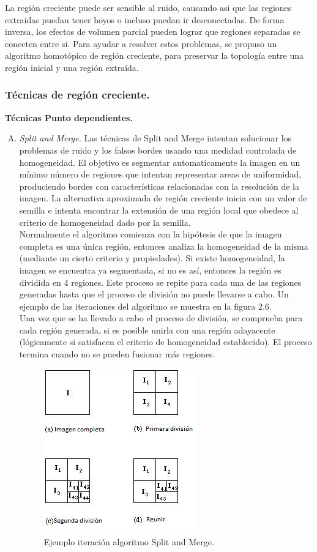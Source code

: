 \documentclass[12pt]{report}
\begin{document}
La región creciente puede ser sensible al ruido, causando asi que las regiones extraidas puedan tener hoyos o incluso puedan ir desconectadas. De forma inversa, los efectos de volumen parcial pueden lograr que regiones separadas se conecten entre si. Para ayudar a resolver estos problemas, se propuso un algoritmo homotópico de región creciente, para preservar la topología entre una región inicial y una región extraída.

\subsubsection{Técnicas de región creciente.}
\textbf{ Técnicas Punto dependientes.}
\begin{enumerate}[A.]
\item \textit{Split and Merge.}
Las técnicas de Split and Merge intentan solucionar los problemas de ruido y los falsos bordes usando una medidad controlada de homogeneidad. El objetivo es segmentar automaticamente la imagen en un mínimo número de regiones que intentan representar areas de uniformidad, produciendo bordes con características relacionadas con la resolución de la imagen. La alternativa aproximada de región creciente inicia con un valor de semilla e intenta encontrar la extensión de una región local que obedece al criterio de homogeneidad dado por la semilla.\\

Normalmente el algoritmo comienza con la hipótesis de que la imagen completa es una única región, entonces analiza la homogeneidad de la misma (mediante un cierto criterio y propiedades). Si existe homogeneidad, la imagen se encuentra ya segmentada, si no es así, entonces la región es dividida en 4 regiones.
Este proceso se repite para cada una de las regiones generadas hasta que el proceso de división no puede llevarse a cabo. Un ejemplo de las iteraciones del algoritmo se muestra en la figura 2.6.\\

Una vez que se ha llevado a cabo el proceso de división, se comprueba para cada región generada, si es posible unirla con una región adayacente (lógicamente si satisfacen el criterio de homogeneidad establecido). El proceso termina cuando no se pueden fusionar más regiones.\cite{split}

\begin{figure}[H]
\centering
\includegraphics[width = 7 cm, height = 7 cm]{split}
\caption{Ejemplo iteración algoritmo Split and Merge.}
\end{figure}
\end{enumerate}
\end{document}
